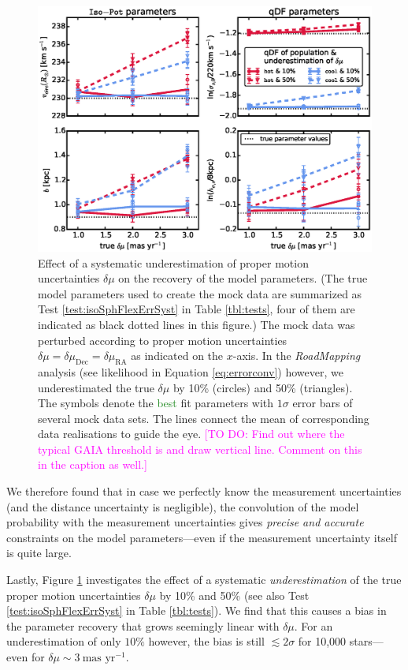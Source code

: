 \documentclass[iop,revtex4]{emulateapj}
\newcommand{\RM}{{\sl RoadMapping}}
\newcommand{\NEW}[1]{\textcolor{ForestGreen}{#1}}
\newcommand{\Wilma}[1]{\textcolor{Magenta}{#1}}
\newcommand{\OLD}[1]{}
\begin{document}
\begin{figure}[!htbp]
\centering
\includegraphics[width=\columnwidth]{figs/isoSphFlexErrSyst_offset_vs_error.eps}
\caption{Effect of a systematic underestimation of proper motion uncertainties $\delta \mu$ on the recovery of the model parameters. (The true model parameters used to create the mock data are summarized as Test \ref{test:isoSphFlexErrSyst} in Table \ref{tbl:tests}, four of them are indicated as black dotted lines in this figure.) The mock data was perturbed according to proper motion uncertainties $\delta \mu = \delta \mu_\text{Dec} = \delta \mu_\text{RA}$ as indicated on the $x$-axis. In the \RM{} analysis (see likelihood in Equation \eqref{eq:errorconv}) however, we underestimated the true $\delta \mu$ by 10\% (circles) and 50\% (triangles). The symbols denote the \OLD{pest}\NEW{best} fit parameters with $1\sigma$ error bars of several mock data sets. The lines connect the mean of corresponding data realisations to guide the eye. \Wilma{[TO DO: Find out where the typical GAIA threshold is and draw vertical line. Comment on this in the caption as well.]}}
\label{fig:isoSphFlexErrSyst}
\end{figure}

We therefore found that in case we perfectly know the measurement uncertainties (and the distance uncertainty is negligible), the convolution of the model probability with the measurement uncertainties gives \emph{precise and accurate} constraints on the model parameters---even if the measurement uncertainty itself is quite large.

Lastly, Figure \ref{fig:isoSphFlexErrSyst} investigates the effect of a systematic \emph{underestimation} of the true proper motion uncertainties $\delta \mu$ by 10\% and 50\% (see also Test \ref{test:isoSphFlexErrSyst} in Table \ref{tbl:tests}). We find that this causes a bias in the parameter recovery that grows seemingly linear with $\delta \mu$. For an underestimation of only $10\%$ however, the bias is still $\lesssim 2 \sigma$ for 10,000 stars---even for $\delta \mu \sim 3~\text{mas yr}^{-1}$.
\end{document}
